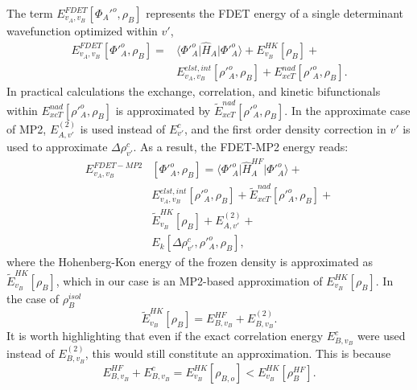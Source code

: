 \documentclass[journal=jctcce,manuscript=article, layout=twocolumn]{achemso}
\begin{document}
The term $E_{v_A,v_B}^{FDET}[\Phi_{A}'^{o},\rho_B]$ represents the FDET energy of a single determinant wavefunction optimized within $v'$,
\begin{align} \label{eq:E_FDET_v'}
{E}_{v_A,v_B}^{FDET}[\Phi'^{o}_{A},\rho_B] = & \langle\Phi'^{o}_{A}\vert \hat{H}_A\vert \Phi'^{o}_{A}\rangle + E^{HK}_{v_B}[\rho_B] + \\ \nonumber
& E^{elst,int}_{v_A,v_B}[\rho'^{o}_A,\rho_B] + E_{xcT}^{nad}[\rho'^{o}_A,\rho_B]. 
\end{align}
In practical calculations the exchange, correlation, and kinetic bifunctionals within $E_{xcT}^{nad}[\rho'^{o}_A,\rho_B]$ is approximated by $\tilde{E}_{xcT}^{nad}[\rho'^{o}_A,\rho_B]$.
In the approximate case of MP2, $E^{(2)}_{A,v'}$ is used instead of $E^c_{v'}$, and the first order density correction in $v'$ is used to approximate  $\Delta \rho^c_{v'}$.
As a result, the FDET-MP2 energy reads:
\begin{align} \label{eq:E_FDET_MP}
 E_{v_A,v_B}^{FDET-MP2} & [\Phi'^{o}_{A},\rho_B] =  \langle\Phi'^{o}_{A}\vert \hat{H}^{HF}_A\vert \Phi'^{o}_{A}\rangle + \\ \nonumber
& E^{elst,int}_{v_A,v_B}[\rho'^{o}_A,\rho_B] + \tilde{E}_{xcT}^{nad}[\rho'^{o}_A,\rho_B] + \\ \nonumber
& \tilde{E}^{HK}_{v_B}[\rho_B] + E^{(2)}_{A,v'} + \\ \nonumber 
& E_k[\Delta \rho^c_{v'}, \rho'^{o}_A, \rho_B],
\end{align}
where the Hohenberg-Kon energy of the frozen density is approximated as $\tilde{E}^{HK}_{v_B}[\rho_B]$, which in our case is an MP2-based approximation of $E^{HK}_{v_B}[\rho_B]$.
In the case of $\rho_B^{isol}$
\begin{equation}\label{eq:HK_iso}
 \tilde{E}^{HK}_{v_B}[\rho_B] = E^{HF}_{B,v_B} + E^{(2)}_{B,v_B}.
\end{equation}
 It is worth highlighting that even if the exact correlation energy $E^c_{B,v_B}$ were used instead of $E^{(2)}_{B,v_B}$, this would still constitute an approximation. This is because
 \begin{equation}\label{eq:HK_HF}
  E^{HF}_{B,v_B} + E^{c}_{B,v_B} = E^{HK}_{v_B}[\rho_{B,o}] < E^{HK}_{v_B}[\rho^{HF}_{B}].
 \end{equation}
\end{document}
